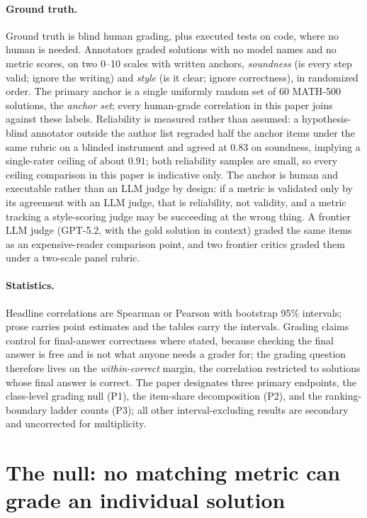 \documentclass[11pt]{article}
\begin{document}
\paragraph{Ground truth.}
Ground truth is blind human grading, plus executed tests on code, where no human is needed.
Annotators graded solutions with no model names and no metric scores, on two 0--10 scales with written anchors, \emph{soundness} (is every step valid; ignore the writing) and \emph{style} (is it clear; ignore correctness), in randomized order.
The primary anchor is a single uniformly random set of 60 \textsc{MATH-500} solutions, the \emph{anchor set}; every human-grade correlation in this paper joins against these labels.
Reliability is measured rather than assumed: a hypothesis-blind annotator outside the author list regraded half the anchor items under the same rubric on a blinded instrument and agreed at $0.83$ on soundness, implying a single-rater ceiling of about $0.91$; both reliability samples are small, so every ceiling comparison in this paper is indicative only.
The anchor is human and executable rather than an LLM judge by design: if a metric is validated only by its agreement with an LLM judge, that is reliability, not validity, and a metric tracking a style-scoring judge may be succeeding at the wrong thing.
A frontier LLM judge (GPT-5.2, with the gold solution in context) graded the same items as an expensive-reader comparison point, and two frontier critics graded them under a two-scale panel rubric.

\paragraph{Statistics.}
Headline correlations are Spearman or Pearson with bootstrap 95\% intervals; prose carries point estimates and the tables carry the intervals.
Grading claims control for final-answer correctness where stated, because checking the final answer is free and is not what anyone needs a grader for; the grading question therefore lives on the \emph{within-correct} margin, the correlation restricted to solutions whose final answer is correct.
The paper designates three primary endpoints, the class-level grading null (P1), the item-share decomposition (P2), and the ranking-boundary ladder counts (P3); all other interval-excluding results are secondary and uncorrected for multiplicity.

\section{The null: no matching metric can grade an individual solution}
\label{sec:p1}
\end{document}
